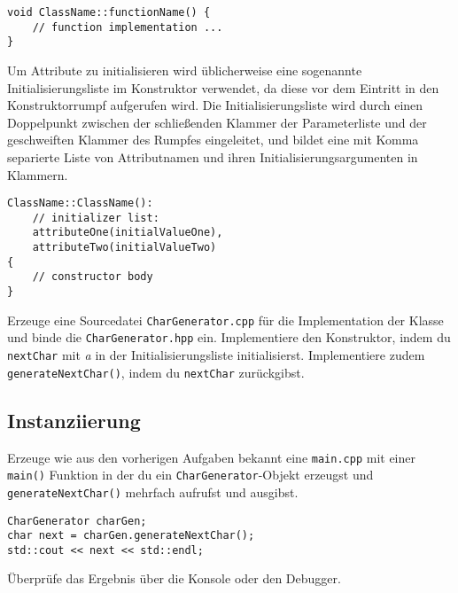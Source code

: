 \begin{lstlisting}
void ClassName::functionName() {
	// function implementation ...
}
\end{lstlisting}

Um Attribute zu initialisieren wird üblicherweise eine sogenannte Initialisierungsliste im Konstruktor verwendet, da diese vor dem Eintritt in den Konstruktorrumpf aufgerufen wird.
Die Initialisierungsliste wird durch einen Doppelpunkt zwischen der schließenden Klammer der Parameterliste und der geschweiften Klammer des Rumpfes eingeleitet, und bildet eine mit Komma separierte Liste von Attributnamen und ihren Initialisierungsargumenten in Klammern.

\begin{lstlisting}
ClassName::ClassName():
	// initializer list:
	attributeOne(initialValueOne),
	attributeTwo(initialValueTwo)
{
	// constructor body
}
\end{lstlisting}

Erzeuge eine Sourcedatei \texttt{CharGenerator.cpp} für die Implementation der Klasse und binde die \texttt{CharGenerator.hpp} ein.
Implementiere den Konstruktor, indem du \texttt{nextChar} mit \emph{a} in der Initialisierungsliste initialisierst.
Implementiere zudem \texttt{generateNextChar()}, indem du \texttt{nextChar} zurückgibst.


\subsection{Instanziierung}
Erzeuge wie aus den vorherigen Aufgaben bekannt eine \texttt{main.cpp} mit einer \texttt{main()} Funktion in der du ein \texttt{CharGenerator}-Objekt erzeugst und \texttt{generateNextChar()} mehrfach aufrufst und ausgibst.

\begin{lstlisting}
CharGenerator charGen;
char next = charGen.generateNextChar();
std::cout << next << std::endl;
\end{lstlisting}

Überprüfe das Ergebnis über die Konsole oder den Debugger.


